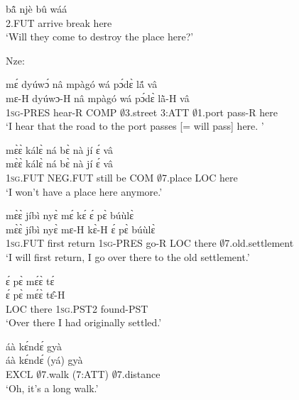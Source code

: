 \begin{exe} 
\exC\label{65}
  \gll   bã̂ njè bû wáá \\
           2.FUT arrive break here  \\
    \trans `Will they come to destroy the place here?'
\end{exe}

\noindent Nze:

\begin{exe} 
\exC\label{66} 
  \glll  mɛ́ dyúwɔ́ nâ mpàgó wá pɔ́dɛ̀ lã́ vâ \\
        mɛ-H dyúwɔ-H nâ mpàgó wá pɔ́dɛ̀ lã̀-H vâ \\
            1\textsc{sg}-PRES hear-R COMP $\emptyset$3.street 3:ATT $\emptyset$1.port pass-R here \\
    \trans `I hear that the road to the port passes [= will pass] here. '
\end{exe}

\begin{exe} 
\exC\label{67}
  \glll  mɛ̀ɛ̀ kálɛ̀ ná bɛ̀ nà jí ɛ́ vâ \\
        mɛ̀ɛ̀ kálɛ̀ ná bɛ̀ nà jí ɛ́ vâ \\
           1\textsc{sg}.FUT NEG.FUT still be COM $\emptyset$7.place LOC here  \\
    \trans `I won't have a place here anymore.'
\end{exe}

\begin{exe} 
\exC\label{68}
  \glll  mɛ̀ɛ̀ jíbì nyɛ̀ mɛ́ kɛ́ ɛ́ pɛ̀ búùlɛ̀ \\
        mɛ̀ɛ̀ jíbì nyɛ̀ mɛ-H kɛ̀-H ɛ́ pɛ̀ búùlɛ̀ \\
           1\textsc{sg}.FUT first return 1\textsc{sg}-PRES go-R LOC there $\emptyset$7.old.settlement  \\
    \trans `I will first return, I go over there to the old settlement.'
\end{exe}

\begin{exe} 
\exC\label{69}
  \glll   ɛ́ pɛ̀ mɛ́ɛ̀ tɛ́ \\
          ɛ́ pɛ̀ mɛ́ɛ̀ tɛ̂-H \\
           LOC there 1\textsc{sg}.PST2 found-PST \\
    \trans `Over there I had originally settled.'
\end{exe}

\begin{exe} 
\exC\label{70}
  \glll  áà kɛ́ndɛ́ gyà \\
          áà kɛ́ndɛ́ (yá) gyà \\
          EXCL $\emptyset$7.walk (7:ATT) $\emptyset$7.distance   \\
    \trans `Oh, it's a long walk.'
\end{exe}

